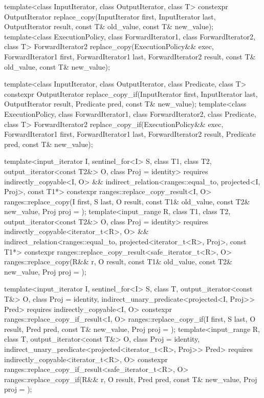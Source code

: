 %
%
\begin{itemdecl}
template<class InputIterator, class OutputIterator, class T>
  constexpr OutputIterator
    replace_copy(InputIterator first, InputIterator last,
                 OutputIterator result,
                 const T& old_value, const T& new_value);
template<class ExecutionPolicy, class ForwardIterator1, class ForwardIterator2, class T>
  ForwardIterator2
    replace_copy(ExecutionPolicy&& exec,
                 ForwardIterator1 first, ForwardIterator1 last,
                 ForwardIterator2 result,
                 const T& old_value, const T& new_value);

template<class InputIterator, class OutputIterator, class Predicate, class T>
  constexpr OutputIterator
    replace_copy_if(InputIterator first, InputIterator last,
                    OutputIterator result,
                    Predicate pred, const T& new_value);
template<class ExecutionPolicy, class ForwardIterator1, class ForwardIterator2,
         class Predicate, class T>
  ForwardIterator2
    replace_copy_if(ExecutionPolicy&& exec,
                    ForwardIterator1 first, ForwardIterator1 last,
                    ForwardIterator2 result,
                    Predicate pred, const T& new_value);

template<input_iterator I, sentinel_for<I> S, class T1, class T2, output_iterator<const T2&> O,
         class Proj = identity>
  requires indirectly_copyable<I, O> &&
           indirect_relation<ranges::equal_to, projected<I, Proj>, const T1*>
  constexpr ranges::replace_copy_result<I, O>
    ranges::replace_copy(I first, S last, O result, const T1& old_value, const T2& new_value,
                         Proj proj = {});
template<input_range R, class T1, class T2, output_iterator<const T2&> O,
         class Proj = identity>
  requires indirectly_copyable<iterator_t<R>, O> &&
           indirect_relation<ranges::equal_to, projected<iterator_t<R>, Proj>, const T1*>
  constexpr ranges::replace_copy_result<safe_iterator_t<R>, O>
    ranges::replace_copy(R&& r, O result, const T1& old_value, const T2& new_value,
                         Proj proj = {});

template<input_iterator I, sentinel_for<I> S, class T, output_iterator<const T&> O,
         class Proj = identity, indirect_unary_predicate<projected<I, Proj>> Pred>
  requires indirectly_copyable<I, O>
  constexpr ranges::replace_copy_if_result<I, O>
    ranges::replace_copy_if(I first, S last, O result, Pred pred, const T& new_value,
                            Proj proj = {});
template<input_range R, class T, output_iterator<const T&> O, class Proj = identity,
         indirect_unary_predicate<projected<iterator_t<R>, Proj>> Pred>
  requires indirectly_copyable<iterator_t<R>, O>
  constexpr ranges::replace_copy_if_result<safe_iterator_t<R>, O>
    ranges::replace_copy_if(R&& r, O result, Pred pred, const T& new_value,
                            Proj proj = {});
\end{itemdecl}

